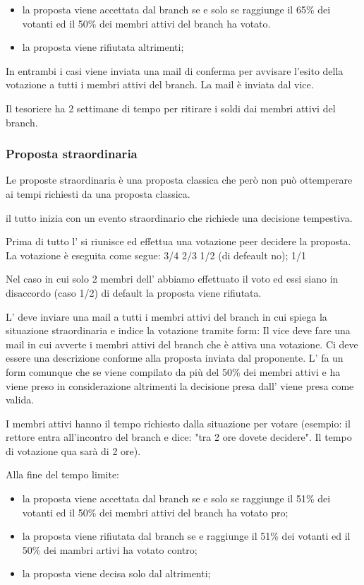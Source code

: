\documentclass[pdf]{article}
\theoremstyle{definition}
\begin{document}
\begin{itemize}
	\item la proposta viene accettata dal branch se e solo se raggiunge il 65\% dei votanti ed il 50\% dei membri attivi del branch ha votato.
	\item la proposta viene rifiutata altrimenti;
\end{itemize}

In entrambi i casi viene inviata una mail di conferma per  avvisare l'esito della votazione a tutti i membri attivi del branch. La mail è inviata dal vice.

Il tesoriere ha 2 settimane di tempo per ritirare i soldi dai membri attivi del branch.

\subsubsection{Proposta straordinaria}

Le proposte straordinaria è una proposta classica che però non può ottemperare ai tempi richiesti da una proposta classica.

il tutto inizia con un evento straordinario che richiede una decisione tempestiva.

Prima di tutto l'\EC{} si riunisce ed effettua una votazione peer decidere la proposta.
La votazione è eseguita come segue:
3/4
2/3
1/2 (di defeault no);
1/1

Nel caso in cui solo 2 membri dell'\EC{} abbiamo effettuato il voto ed essi siano in disaccordo (caso 1/2) di default la proposta viene rifiutata.

L'\EC{} deve inviare una mail a tutti i membri attivi del branch in cui spiega la situazione straordinaria e indice la votazione tramite form: 
Il vice deve fare una mail in cui avverte i membri attivi del branch che è attiva una votazione. Ci deve essere una descrizione conforme alla proposta inviata dal proponente. 
L'\EC{} fa un form comunque che se viene compilato da più del 50\% dei membri attivi e ha viene preso in considerazione altrimenti la decisione presa dall'\EC{} viene presa come valida.

I membri attivi hanno il tempo richiesto dalla situazione per votare (esempio: il rettore entra all'incontro del branch e dice: "tra 2 ore dovete decidere". Il tempo di votazione qua sarà di 2 ore).

Alla fine del tempo limite:

\begin{itemize}
	\item la proposta viene accettata dal branch se e solo se raggiunge il 51\% dei votanti ed il 50\% dei membri attivi del branch ha votato pro;
	\item la proposta viene rifiutata dal branch se e raggiunge il 51\% dei votanti ed il 50\% dei mambri artivi ha votato contro;
	\item la proposta viene decisa solo dal \EC{} altrimenti;
\end{itemize}
\end{document}
